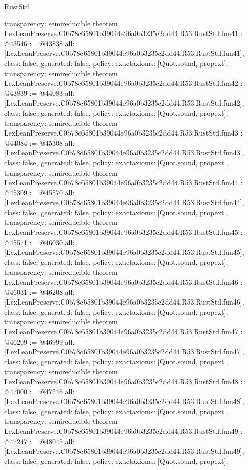 \begin{lexlean}{RustStd}
\begin{coremodule}
{  transparency: semireducible
}
theorem LexLeanPreserve.C0b78c65801b39044e96a0b3235c2dd44.R53.RustStd.fun41 : @43546 := @43838 {
  all: [LexLeanPreserve.C0b78c65801b39044e96a0b3235c2dd44.R53.RustStd.fun41],
  class: false,
  generated: false,
  policy: exact{axioms: [Quot.sound, propext]},
  transparency: semireducible
}
theorem LexLeanPreserve.C0b78c65801b39044e96a0b3235c2dd44.R53.RustStd.fun42 : @43839 := @44083 {
  all: [LexLeanPreserve.C0b78c65801b39044e96a0b3235c2dd44.R53.RustStd.fun42],
  class: false,
  generated: false,
  policy: exact{axioms: [Quot.sound, propext]},
  transparency: semireducible
}
theorem LexLeanPreserve.C0b78c65801b39044e96a0b3235c2dd44.R53.RustStd.fun43 : @44084 := @45308 {
  all: [LexLeanPreserve.C0b78c65801b39044e96a0b3235c2dd44.R53.RustStd.fun43],
  class: false,
  generated: false,
  policy: exact{axioms: [Quot.sound, propext]},
  transparency: semireducible
}
theorem LexLeanPreserve.C0b78c65801b39044e96a0b3235c2dd44.R53.RustStd.fun44 : @45309 := @45570 {
  all: [LexLeanPreserve.C0b78c65801b39044e96a0b3235c2dd44.R53.RustStd.fun44],
  class: false,
  generated: false,
  policy: exact{axioms: [Quot.sound, propext]},
  transparency: semireducible
}
theorem LexLeanPreserve.C0b78c65801b39044e96a0b3235c2dd44.R53.RustStd.fun45 : @45571 := @46030 {
  all: [LexLeanPreserve.C0b78c65801b39044e96a0b3235c2dd44.R53.RustStd.fun45],
  class: false,
  generated: false,
  policy: exact{axioms: [Quot.sound, propext]},
  transparency: semireducible
}
theorem LexLeanPreserve.C0b78c65801b39044e96a0b3235c2dd44.R53.RustStd.fun46 : @46031 := @46208 {
  all: [LexLeanPreserve.C0b78c65801b39044e96a0b3235c2dd44.R53.RustStd.fun46],
  class: false,
  generated: false,
  policy: exact{axioms: [Quot.sound, propext]},
  transparency: semireducible
}
theorem LexLeanPreserve.C0b78c65801b39044e96a0b3235c2dd44.R53.RustStd.fun47 : @46209 := @46999 {
  all: [LexLeanPreserve.C0b78c65801b39044e96a0b3235c2dd44.R53.RustStd.fun47],
  class: false,
  generated: false,
  policy: exact{axioms: [Quot.sound, propext]},
  transparency: semireducible
}
theorem LexLeanPreserve.C0b78c65801b39044e96a0b3235c2dd44.R53.RustStd.fun48 : @47000 := @47246 {
  all: [LexLeanPreserve.C0b78c65801b39044e96a0b3235c2dd44.R53.RustStd.fun48],
  class: false,
  generated: false,
  policy: exact{axioms: [Quot.sound, propext]},
  transparency: semireducible
}
theorem LexLeanPreserve.C0b78c65801b39044e96a0b3235c2dd44.R53.RustStd.fun49 : @47247 := @48045 {
  all: [LexLeanPreserve.C0b78c65801b39044e96a0b3235c2dd44.R53.RustStd.fun49],
  class: false,
  generated: false,
  policy: exact{axioms: [Quot.sound, propext]},
}
\end{coremodule}
\end{lexlean}
